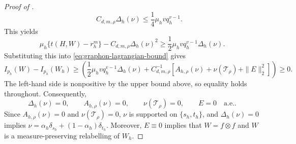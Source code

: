 \begin{proof}[Proof of ]
\[  \qquad
  C_{d,m,\rho}\Delta_h(\nu)\le\frac14\mu_hvq_h^{v-1}.
\]
This yields
\begin{equation*}
  \mu_h\{t(H,W)-r_h^m\}-C_{d,m,\rho}\Delta_h(\nu)^2
  \ge\frac12\mu_hvq_h^{v-1}\Delta_h(\nu).
\end{equation*}
Substituting this into \eqref{eq:graphon-lagrangian-bound} gives
\begin{equation*}
  I_{p_h}(W)-I_{p_h}(W_h)
  \ge
  \left(\frac12\mu_hvq_h^{v-1}\Delta_h(\nu)
    +C_{d,m,\rho}^{-1}
    \left[A_{h,\rho}(\nu)+\nu(\mathcal T_\rho)+\|E\|_2^2\right]\right)
  \ge0.
\end{equation*}
The left-hand side is nonpositive by the upper bound above, so equality holds
throughout.  Consequently,
\begin{equation*}
  \Delta_h(\nu)=0,
  \qquad A_{h,\rho}(\nu)=0,
  \qquad \nu(\mathcal T_\rho)=0,
  \qquad E=0\quad\text{a.e.}.
\end{equation*}
Since $A_{h,\rho}(\nu)=0$ and $\nu(\mathcal T_\rho)=0$,
$\nu$ is supported on $\{s_h,t_h\}$, and $\Delta_h(\nu)=0$ implies
$\nu=\alpha_h\delta_{s_h}+(1-\alpha_h)\delta_{t_h}$.
Moreover, $E\equiv0$ implies that $W=f\otimes f$ and $W$ is a measure-preserving relabelling of $W_h$.
\end{proof}
